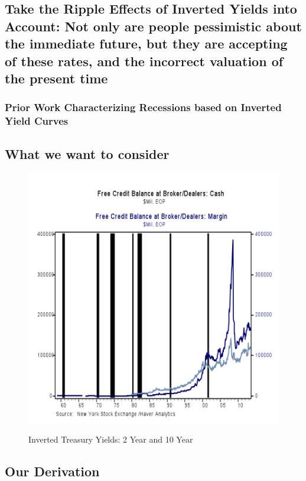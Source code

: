 
\subsection{Take the Ripple Effects of Inverted Yields into Account: Not only are people pessimistic about the immediate future, but they are accepting of these rates, and the incorrect valuation of the present time}
\subsubsection{Prior Work Characterizing Recessions based on Inverted Yield Curves}
\subsection{What we want to consider}

\begin{figure}[H]
\centering
\includegraphics[scale=.70]{figure/FreeCredit_cash_and_margin.png}\\[-0.7cm]
\caption{Inverted Treasury Yields: 2 Year and 10 Year\label{fig:debitMargin}}
\end{figure}


\subsection{Our Derivation}
